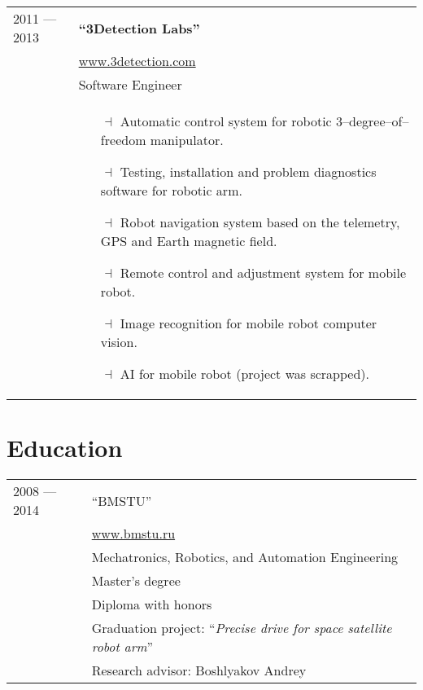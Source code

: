 \documentclass[a4paper, 10pt]{article}
\begin{document}
\begin{longtable}{p{20mm}|p{140mm}}
2011 --- 2013 & \textbf{``3Detection Labs''} \\
& \href{http://www.3detection.com/}{www.3detection.com} \\
& Software Engineer \\
& \begin{itemize}[topsep = 0pt, itemsep = 0pt]
    \item[$\dashv$] Automatic control system for robotic 3--degree--of--freedom manipulator.
    \item[$\dashv$] Testing, installation and problem diagnostics software for robotic arm.
    \item[$\dashv$] Robot navigation system based on the telemetry, GPS and Earth magnetic field.
    \item[$\dashv$] Remote control and adjustment system for mobile robot.
    \item[$\dashv$] Image recognition for mobile robot computer vision.
    \item[$\dashv$] AI for mobile robot (project was scrapped).
\end{itemize}
\\
\end{longtable}

\section{Education}
\begin{longtable}{p{20mm}|p{140mm}}
2008 --- 2014
& ``BMSTU'' \\
& \href{http://www.bmstu.ru}{www.bmstu.ru} \\
& Mechatronics, Robotics, and Automation Engineering \\
& Master's degree \\
& Diploma with honors \\
& Graduation project: ``\textit{Precise drive for space satellite robot arm}'' \\
& Research advisor: Boshlyakov Andrey \\
\end{longtable}

\end{document}
